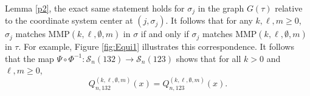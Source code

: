 \documentclass[
final,nomarks
]{dmtcs-episciences}
\newcommand{\fref}[1]{Figure \ref{fig:#1}}
\newcommand{\Sn}[1]{\mathcal{S}_{#1}}
\newcommand{\MMP}{\mathrm{MMP}}
\begin{document}
Lemma \ref{p2}, the exact 
same statement holds for \begin{math}\sigma_j\end{math} in the graph \begin{math}G(\tau)\end{math} relative to the coordinate 
system center at \begin{math}(j,\sigma_j)\end{math}. It follows that for any \begin{math}k,\ell,m \geq 0\end{math}, 
\begin{math}\sigma_j\end{math} matches \begin{math}\MMP(k,\ell,\emptyset,m)\end{math} in \begin{math}\sigma\end{math} if and only if 
\begin{math}\sigma_j\end{math} matches \begin{math}\MMP(k,\ell,\emptyset,m)\end{math} in \begin{math}\tau\end{math}. 
For example, \fref{Equi1} illustrates this correspondence. It follows 
that the map \begin{math}\Psi \circ \Phi^{-1}:\Sn{n}(132) \rightarrow \Sn{n}(123)\end{math} shows 
that for all \begin{math}k > 0\end{math} and \begin{math}\ell,m \geq 0\end{math}, 
\begin{equation}
Q_{n,132}^{(k,\ell, \emptyset,m)}(x) = Q_{n,123}^{(k,\ell, \emptyset,m)}(x).
\end{equation}
\end{document}
